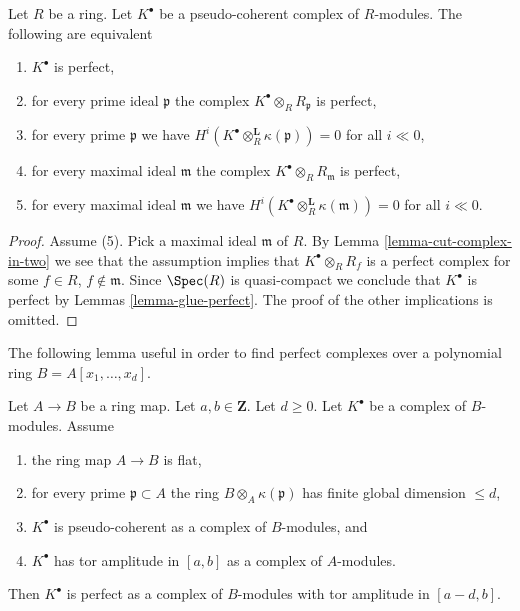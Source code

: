 \begin{lemma}
\label{lemma-check-perfect-stalks}
Let $R$ be a ring. Let $K^\bullet$ be a pseudo-coherent
complex of $R$-modules. The following are equivalent
\begin{enumerate}
\item $K^\bullet$ is perfect,
\item for every prime ideal $\mathfrak p$ the complex
$K^\bullet \otimes_R R_{\mathfrak p}$ is perfect,
\item for every prime $\mathfrak p$ we have
$H^i(K^\bullet \otimes_R^{\mathbf{L}} \kappa(\mathfrak p)) = 0$ for all
$i \ll 0$,
\item for every maximal ideal $\mathfrak m$ the complex
$K^\bullet \otimes_R R_{\mathfrak m}$ is perfect,
\item for every maximal ideal $\mathfrak m$ we have
$H^i(K^\bullet \otimes_R^{\mathbf{L}} \kappa(\mathfrak m)) = 0$ for all
$i \ll 0$.
\end{enumerate}
\end{lemma}

\begin{proof}
Assume (5). Pick a maximal ideal $\mathfrak m$ of $R$. By
Lemma \ref{lemma-cut-complex-in-two}
we see that the assumption implies that $K^\bullet \otimes_R R_f$
is a perfect complex for some $f \in R$, $f \not \in \mathfrak m$.
Since $\Spec(R)$ is quasi-compact we conclude that $K^\bullet$
is perfect by
Lemmas \ref{lemma-glue-perfect}.
The proof of the other implications is omitted.
\end{proof}

\noindent
The following lemma useful in order to find perfect complexes
over a polynomial ring $B = A[x_1, \ldots, x_d]$.

\begin{lemma}
\label{lemma-perfect-over-polynomial-ring}
Let $A \to B$ be a ring map. Let $a, b \in \mathbf{Z}$. Let $d \geq 0$.
Let $K^\bullet$ be a complex of $B$-modules. Assume
\begin{enumerate}
\item the ring map $A \to B$ is flat,
\item for every prime $\mathfrak p \subset A$ the ring
$B \otimes_A \kappa(\mathfrak p)$ has finite global dimension $\leq d$,
\item $K^\bullet$ is pseudo-coherent as a complex of $B$-modules, and
\item $K^\bullet$ has tor amplitude in $[a, b]$ as a complex
of $A$-modules.
\end{enumerate}
Then $K^\bullet$ is perfect as a complex of $B$-modules
with tor amplitude in $[a - d, b]$.
\end{lemma}

